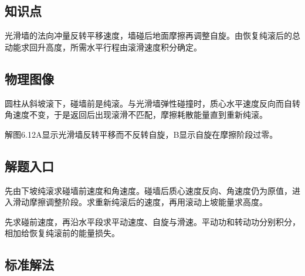 \documentclass[UTF8,fontset=fandol,a4paper,11pt]{ctexart}
\begin{document}


\subsection*{知识点}

光滑墙的法向冲量反转平移速度，墙碰后地面摩擦再调整自旋。由恢复纯滚后的总动能求回升高度，所需水平行程由滚滑速度积分确定。




\subsection*{物理图像}

圆柱从斜坡滚下，碰墙前是纯滚。与光滑墙弹性碰撞时，质心水平速度反向而自转角速度不变，于是返回后出现滚滑不匹配，摩擦耗散能量直到重新纯滚。

解图6.12A显示光滑墙反转平移而不反转自旋，B显示自旋在摩擦阶段过零。



\subsection*{解题入口}

先由下坡纯滚求碰墙前速度和角速度。碰墙后质心速度反向、角速度仍为原值，进入滑动摩擦调整阶段。求重新纯滚后的速度，再用滚动上坡能量求高度。

先求碰前速度，再沿水平段求平动速度、自旋与滑速。平动功和转动功分别积分，相加给恢复纯滚前的能量损失。



\subsection*{标准解法}
\end{document}

